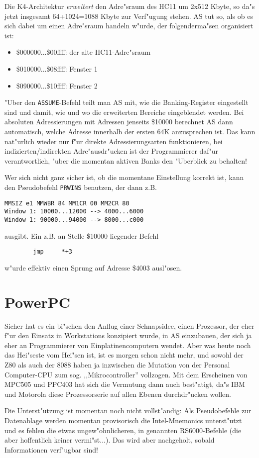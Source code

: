 \documentclass[12pt,a4paper,twoside]{report}
\begin{document}
Die K4-Architektur {\em erweitert} den Adre"sraum des HC11 um 2x512 Kbyte,
so da"s jetzt insgesamt 64+1024=1088 Kbyte zur Verf"ugung stehen.  AS tut
so, als ob es sich dabei um einen Adre"sraum handeln w"urde, der
folgenderma"sen organisiert ist:
\begin{itemize}
\item{\$000000...\$00ffff: der alte HC11-Adre"sraum}
\item{\$010000...\$08ffff: Fenster 1}
\item{\$090000...\$10ffff: Fenster 2}
\end{itemize}
"Uber den {\tt ASSUME}-Befehl teilt man AS mit, wie die Banking-Register
eingestellt sind und damit, wie und wo die erweiterten Bereiche
eingeblendet werden.  Bei absoluten Adressierungen mit Adressen jenseits
\$10000 berechnet AS dann automatisch, welche Adresse innerhalb der ersten
64K anzusprechen ist.  Das kann nat"urlich wieder nur f"ur direkte
Adressierungsarten funktionieren, bei indizierten/indirekten
Adre"ausdr"ucken ist der Programmierer daf"ur verantwortlich, "uber die
momentan aktiven Banks den "Uberblick zu behalten!

Wer sich nicht ganz sicher ist, ob die momentane Einstellung korrekt ist,
kann den Pseudobefehl {\tt PRWINS} benutzen, der dann z.B.
\begin{verbatim}
MMSIZ e1 MMWBR 84 MM1CR 00 MM2CR 80
Window 1: 10000...12000 --> 4000...6000
Window 1: 90000...94000 --> 8000...c000
\end{verbatim}
ausgibt.  Ein z.B. an Stelle \$10000 liegender Befehl
\begin{verbatim}
        jmp     *+3
\end{verbatim}
w"urde effektiv einen Sprung auf Adresse \$4003 ausl"osen.


\section{PowerPC}

Sicher hat es ein bi"schen den Anflug einer Schnapsidee, einen Prozessor,
der eher f"ur den Einsatz in Workstations konzipiert wurde, in AS
einzubauen, der sich ja eher an Programmierer von Einplatinencomputern
wendet.  Aber was heute noch das Hei"seste vom Hei"sen ist, ist es morgen
schon nicht mehr, und sowohl der Z80 als auch der 8088 haben ja inzwischen
die Mutation von der Personal Computer-CPU zum sog. ,,Mikrocontroller''
vollzogen.  Mit dem Erscheinen von MPC505 und PPC403 hat sich die Vermutung
dann auch best"atigt, da"s IBM und Motorola diese Prozessorserie auf allen
Ebenen durchdr"ucken wollen.
\par
Die Unterst"utzung ist momentan noch nicht vollst"andig: Als Pseudobefehle
zur Datenablage werden momentan provisorisch die Intel-Mnemonics
unterst"utzt und es fehlen die etwas ungew"ohnlicheren, in \cite{Mot601}
genannten RS6000-Befehle (die aber hoffentlich keiner vermi"st...).  Das
wird aber nachgeholt, sobald Informationen verf"ugbar sind!
\end{document}
